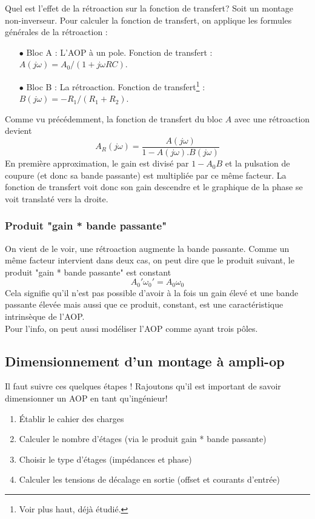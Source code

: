 		Quel est l'effet de la rétroaction sur la fonction de transfert? Soit un 
		montage non-inverseur. Pour calculer la fonction de transfert, on applique 
		les formules générales de la rétroaction :
		\begin{itemize}
		\item[$\bullet$] Bloc A : L'AOP à un pole. Fonction de transfert : $A(j\omega) 
		= A_0/(1+j\omega RC)$.
		\item[$\bullet$] Bloc B : La rétroaction. Fonction de transfert\footnote{Voir 
		plus haut, déjà étudié.} : $B(j\omega) = -R_1/(R_1+R_2)$.
		\end{itemize}
		Comme vu précédemment, la fonction de transfert du bloc $A$ avec une rétroaction 
		devient 
		\begin{equation}
		A_R(j\omega) = \dfrac{A(j\omega)}{1-A(j\omega).B(j\omega)}
		\end{equation}
		En première approximation, le gain est divisé par $1-A_0B$ et la pulsation de 
		coupure (et donc sa bande passante) est multipliée par ce même facteur. La fonction 
		de transfert voit donc 	son gain descendre et le graphique de la phase se voit translaté 
		vers la droite.
	
	
		\subsubsection{Produit "gain * bande passante"}
		On vient de le voir, une rétroaction augmente la bande passante. Comme un 
		même facteur intervient dans deux cas, on peut dire que le produit suivant, 
		le produit "gain * bande passante" est constant 
		\begin{equation}
		A_0'\omega_0' = A_0\omega_0
		\end{equation}
		Cela signifie qu'il n'est pas possible d'avoir à la fois un gain élevé et une 
		bande passante élevée mais aussi que ce produit, constant, est une caractéristique 
		intrinsèque de l'AOP.\\
		Pour l'info, on peut aussi modéliser l'AOP comme ayant trois pôles.
		
	\setcounter{subsection}{3}
	\subsection{Dimensionnement d'un montage à ampli-op}
	Il faut suivre ces quelques étapes ! Rajoutons qu'il est important de savoir 
	dimensionner un AOP en tant qu'ingénieur!
	\begin{enumerate}
	\item Établir le cahier des charges
	\item Calculer le nombre d'étages (via le produit gain * bande passante)
	\item Choisir le type d'étages (impédances et phase)
	\item Calculer les tensions de décalage en sortie (offset et courants d'entrée)
	\end{enumerate}
	
	
	
	
	
	
	
	
	
	
	
	
	
	
	
	
	